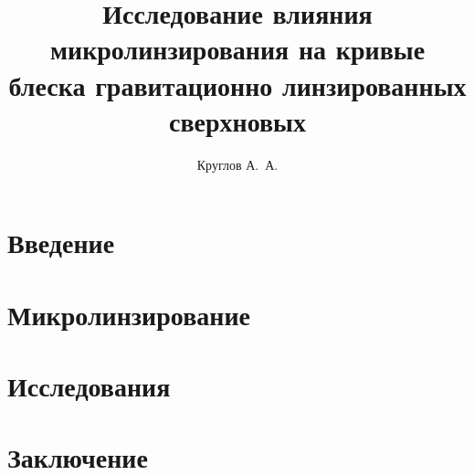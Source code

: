 \documentclass{mipt-thesis-bs}
\title{Исследование влияния микролинзирования на кривые
           блеска гравитационно линзированных сверхновых}
\author{Круглов А.\ А.}
\numberwithin{equation}{chapter}
\begin{document}
    

    \frontmatter
    \titlecontents
    
   
    \mainmatter


\chapter{Введение} \setcounter{page}{3}
    

\chapter{Микролинзирование}
    
    
\chapter{Исследования}
    

\chapter{Заключение}
    

    \backmatter

    \printbib
    
    
\end{document}
